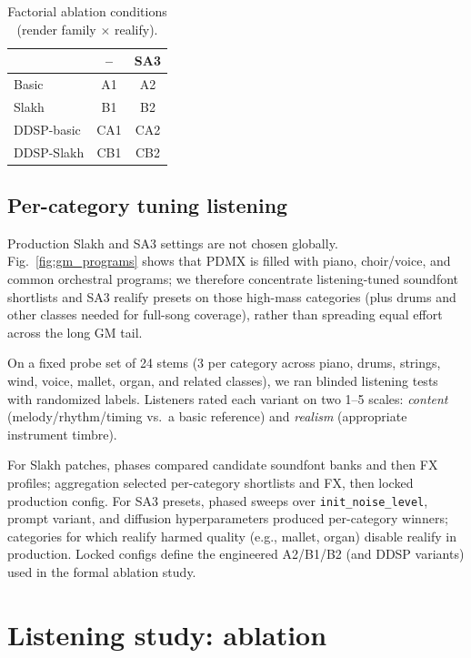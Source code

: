 \documentclass{article}
\begin{document}
\begin{table}[t]
\centering
\caption{Factorial ablation conditions (render family $\times$ realify).}
\label{tab:ablations}
\vspace{1mm}
\small
\begin{tabular}{@{}lcc@{}}
\toprule
 & -- & SA3 \\
\midrule
Basic       & A1  & A2  \\
Slakh       & B1  & B2  \\
DDSP-basic  & CA1 & CA2 \\
DDSP-Slakh  & CB1 & CB2 \\
\bottomrule
\end{tabular}
\end{table}

\subsection{Per-category tuning listening}
\label{ssec:tuning}

Production Slakh and SA3 settings are not chosen globally.
Fig.~\ref{fig:gm_programs} shows that PDMX is filled with piano, choir/voice, and common orchestral programs; we therefore concentrate listening-tuned soundfont shortlists and SA3 realify presets on those high-mass categories (plus drums and other classes needed for full-song coverage), rather than spreading equal effort across the long GM tail.

On a fixed probe set of 24 stems (3 per category across piano, drums, strings, wind, voice, mallet, organ, and related classes), we ran blinded listening tests with randomized labels.
Listeners rated each variant on two 1--5 scales: \emph{content} (melody/rhythm/timing vs.\ a basic reference) and \emph{realism} (appropriate instrument timbre).

For Slakh patches, phases compared candidate soundfont banks and then FX profiles; aggregation selected per-category shortlists and FX, then locked production config.
For SA3 presets, phased sweeps over \texttt{init\_noise\_level}, prompt variant, and diffusion hyperparameters produced per-category winners; categories for which realify harmed quality (e.g., mallet, organ) disable realify in production.
Locked configs define the engineered A2/B1/B2 (and DDSP variants) used in the formal ablation study.

\section{Listening study: ablation}
\label{sec:listening}
\end{document}
